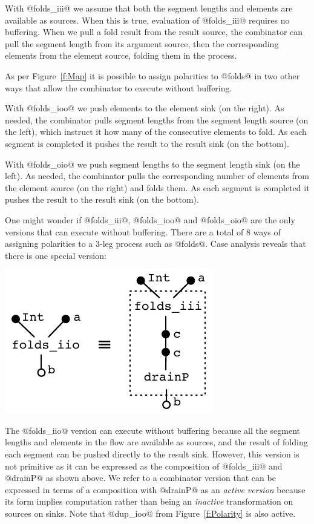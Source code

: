 With @folds_iii@ we assume that both the segment lengths and elements are available as sources. When this is true, evaluation of @folds_iii@ requires no buffering. When we pull a fold result from the result source, the combinator can pull the segment length from its argument source, then the corresponding elements from the element source, folding them in the process. 

As per Figure~\ref{f:Map} it is possible to assign polarities to @folds@ in two other ways that allow the combinator to execute without buffering. 

With @folds_ioo@ we push elements to the element sink (on the right). As needed, the combinator pulls segment lengths from the segment length source (on the left), which instruct it how many of the consecutive elements to fold. As each segment is completed it pushes the result to the result sink (on the bottom).

With @folds_oio@ we push segment lengths to the segment length sink (on the left). As needed, the combinator pulls the corresponding number of elements from the element source (on the right) and folds them. As each segment is completed it pushes the result to the result sink (on the bottom). 

One might wonder if @folds_iii@, @folds_ioo@ and @folds_oio@ are the only versions that can execute without buffering. There are a total of 8 ways of assigning polarities to a 3-leg process such as @folds@. Case analysis reveals that there is one special version:
\vspace{-1ex}
\begin{center}
\includegraphics[scale=0.8]{figures/folds-drain.pdf}
\end{center}

\vspace{-1ex}
The @folds_iio@ version can execute without buffering because all the segment lengths and elements in the flow are available as sources, and the result of folding each segment can be pushed directly to the result sink. However, this version is not primitive as it can be expressed as the composition of @folds_iii@ and @drainP@ as shown above. We refer to a combinator version that can be expressed in terms of a composition with @drainP@ as an \emph{active version} because its form implies computation rather than being an \emph{inactive} transformation on sources on sinks. Note that @dup_ioo@ from Figure~\ref{f:Polarity} is also active.

